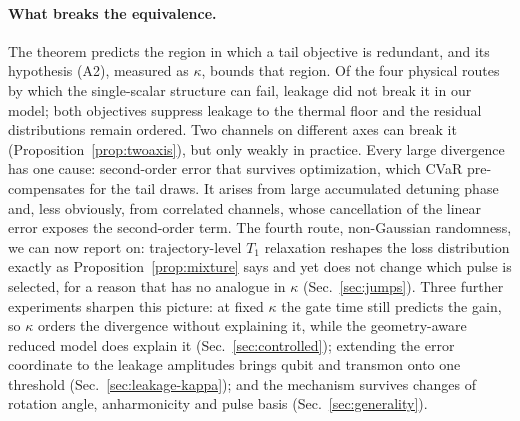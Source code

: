 \documentclass[aps,pra,twocolumn,superscriptaddress,reprint,nofootinbib,floatfix]{revtex4-2}
\theoremstyle{definition}
\begin{document}
\paragraph*{What breaks the equivalence.} The theorem predicts the region in
which a tail objective is redundant, and its hypothesis (A2), measured as
$\kappa$, bounds that region. Of the four physical routes by which the
single-scalar structure can fail, leakage did not break it in our model;
both objectives suppress leakage to the thermal floor and the residual
distributions remain ordered. Two channels on different axes can break it
(Proposition~\ref{prop:twoaxis}), but only weakly in practice. Every large
divergence has one cause: second-order error that survives optimization,
which CVaR pre-compensates for the tail draws. It arises from large
accumulated detuning phase and, less obviously, from correlated channels,
whose cancellation of the linear error exposes the second-order term. The
fourth route, non-Gaussian randomness, we can now report on: trajectory-level
$T_1$ relaxation reshapes the loss distribution exactly as
Proposition~\ref{prop:mixture} says and yet does not change which pulse is
selected, for a reason that has no analogue in $\kappa$
(Sec.~\ref{sec:jumps}). Three further experiments sharpen this
picture: at fixed $\kappa$ the gate time still predicts the gain, so $\kappa$
orders the divergence without explaining it, while the geometry-aware reduced
model does explain it (Sec.~\ref{sec:controlled}); extending the error
coordinate to the leakage amplitudes brings qubit and transmon onto one
threshold (Sec.~\ref{sec:leakage-kappa}); and the mechanism survives changes
of rotation angle, anharmonicity and pulse basis (Sec.~\ref{sec:generality}).
\end{document}
